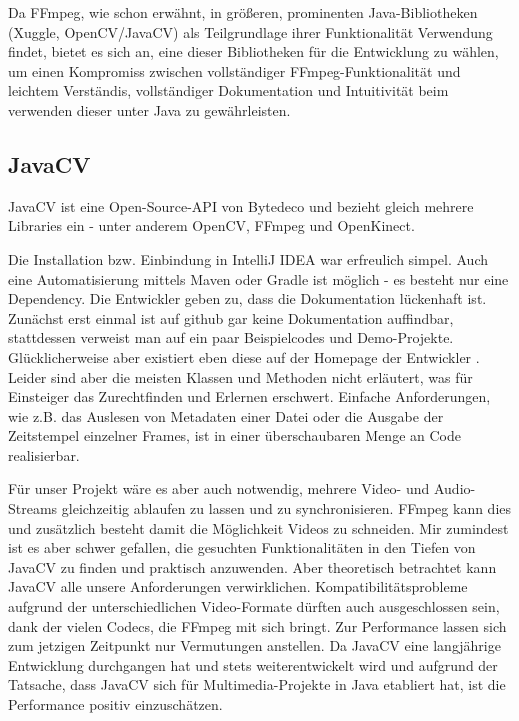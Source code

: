 Da FFmpeg, wie schon erwähnt, in größeren, prominenten Java-Bibliotheken (Xuggle, OpenCV/JavaCV) als Teilgrundlage ihrer Funktionalität Verwendung findet, bietet es sich an, eine dieser Bibliotheken für die Entwicklung zu wählen, um einen Kompromiss zwischen vollständiger FFmpeg-Funktionalität und leichtem Verständis, vollständiger Dokumentation und Intuitivität beim verwenden dieser unter Java zu gewährleisten.

\subsection{JavaCV}
JavaCV ist eine Open-Source-API von Bytedeco und bezieht gleich mehrere Libraries ein - unter anderem OpenCV, FFmpeg und OpenKinect.

Die Installation bzw. Einbindung in IntelliJ IDEA war erfreulich simpel. Auch eine Automatisierung mittels Maven oder Gradle ist möglich - es besteht nur eine Dependency. Die Entwickler geben zu, dass die Dokumentation lückenhaft ist. Zunächst erst einmal ist auf github gar keine Dokumentation auffindbar, stattdessen verweist man auf ein paar Beispielcodes und Demo-Projekte. Glücklicherweise aber existiert eben diese auf der Homepage der Entwickler \cite{javacv_api_doc}. Leider sind aber die meisten Klassen und Methoden nicht erläutert, was für Einsteiger das Zurechtfinden und Erlernen erschwert. Einfache Anforderungen, wie z.B. das Auslesen von Metadaten einer Datei oder die Ausgabe der Zeitstempel einzelner Frames, ist in einer überschaubaren Menge an Code realisierbar.

Für unser Projekt wäre es aber auch notwendig, mehrere Video- und Audio-Streams gleichzeitig ablaufen zu lassen und zu synchronisieren. FFmpeg kann dies und zusätzlich besteht damit die Möglichkeit Videos zu schneiden. Mir zumindest ist es aber schwer gefallen, die gesuchten Funktionalitäten in den Tiefen von JavaCV zu finden und praktisch anzuwenden. Aber theoretisch betrachtet kann JavaCV alle unsere Anforderungen verwirklichen. Kompatibilitätsprobleme aufgrund der unterschiedlichen Video-Formate dürften auch ausgeschlossen sein, dank der vielen Codecs, die FFmpeg mit sich bringt. Zur Performance lassen sich zum jetzigen Zeitpunkt nur Vermutungen anstellen. Da JavaCV eine langjährige Entwicklung durchgangen hat und stets weiterentwickelt wird und aufgrund der Tatsache, dass JavaCV sich für Multimedia-Projekte in Java etabliert hat, ist die Performance positiv einzuschätzen.
